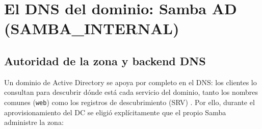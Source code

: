\begin{table}[H]
  \centering
  \caption{Mapa de nombres gestionados por el DNS de \texttt{sudoers.lan}}
  \label{tab:mapa-nombres}
\end{table}

\section{El DNS del dominio: Samba AD (SAMBA\_INTERNAL)}

\subsection{Autoridad de la zona y backend DNS}

Un dominio de Active Directory se apoya por completo en el DNS: los clientes
lo consultan para descubrir d\'onde est\'a cada servicio del dominio, tanto
los nombres comunes (\texttt{web}) como los registros de descubrimiento (SRV)
\citep{msft_activedirectory}. Por ello, durante el aprovisionamiento del DC se
eligi\'o expl\'icitamente que el propio Samba administre la zona:

